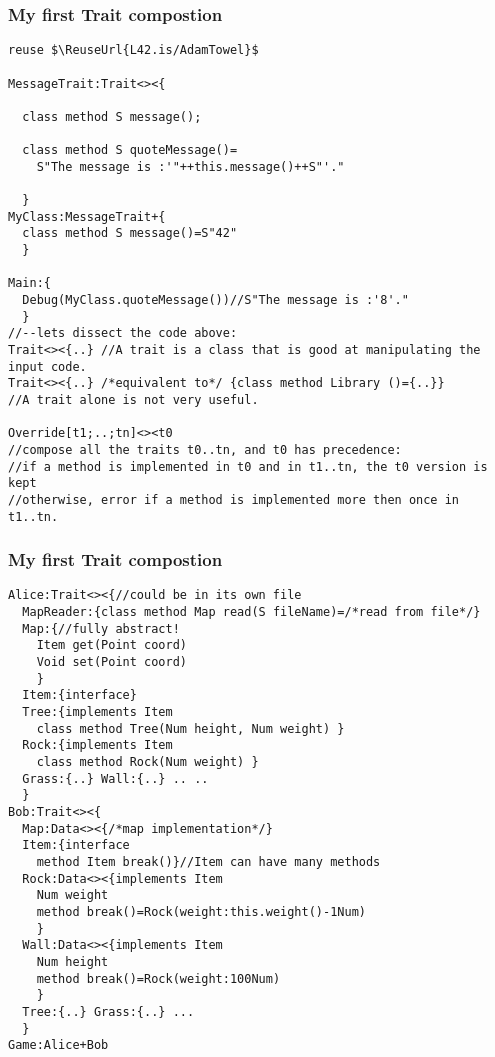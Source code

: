 \begin{frame}[fragile]
\frametitle{My first Trait compostion}
\begin{NiceCode}{59ex}{0.8}
\begin{lstlisting}
reuse $\ReuseUrl{L42.is/AdamTowel}$

MessageTrait:Trait<><{

  class method S message();

  class method S quoteMessage()=
    S"The message is :'"++this.message()++S"'."

  }
MyClass:MessageTrait+{
  class method S message()=S"42"
  }

Main:{
  Debug(MyClass.quoteMessage())//S"The message is :'8'."
  }
//--lets dissect the code above:
Trait<><{..} //A trait is a class that is good at manipulating the input code.
Trait<><{..} /*equivalent to*/ {class method Library ()={..}}
//A trait alone is not very useful.

Override[t1;..;tn]<><t0
//compose all the traits t0..tn, and t0 has precedence:
//if a method is implemented in t0 and in t1..tn, the t0 version is kept
//otherwise, error if a method is implemented more then once in t1..tn.
\end{lstlisting}
\end{NiceCode}
\end{frame}

\begin{frame}[fragile]
\frametitle{My first Trait compostion}
\begin{NiceCode}{59ex}{0.8}
\begin{lstlisting}
Alice:Trait<><{//could be in its own file
  MapReader:{class method Map read(S fileName)=/*read from file*/}
  Map:{//fully abstract!
    Item get(Point coord)
    Void set(Point coord)
    }
  Item:{interface}
  Tree:{implements Item
    class method Tree(Num height, Num weight) }
  Rock:{implements Item
    class method Rock(Num weight) }
  Grass:{..} Wall:{..} .. ..
  }
Bob:Trait<><{
  Map:Data<><{/*map implementation*/}
  Item:{interface 
    method Item break()}//Item can have many methods
  Rock:Data<><{implements Item
    Num weight
    method break()=Rock(weight:this.weight()-1Num)
    }
  Wall:Data<><{implements Item
    Num height
    method break()=Rock(weight:100Num)
    }
  Tree:{..} Grass:{..} ...
  }
Game:Alice+Bob
\end{lstlisting}
\end{NiceCode}
\end{frame}

